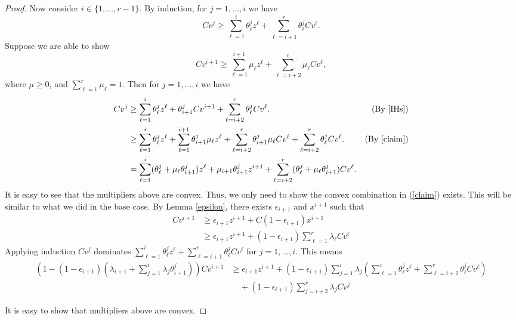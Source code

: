 \begin{proof}
	Now consider $i\in \{1,\ldots,r-1\}$. By induction, for $j=1,\ldots,i$ we have
	\begin{equation}\label{IHs}
	Cv^j \geq  \sum_{\ell=1}^{i} \theta^{j}_\ell z^\ell + \sum_{\ell=i+1}^{r}\theta^{j}_{\ell}Cv^\ell.
	\end{equation}
	Suppose we are able to show 
	 \begin{equation}\label{claim} 
	 Cv^{i+1} \geq \sum_{\ell=1}^{i+1} \mu_\ell z^\ell + \sum_{\ell=i+2}^{r}\mu_{\ell}Cv^\ell,\end{equation} 
	where $\mu\geq 0$, and $\sum_{\ell=1}^{r}\mu_{\ell}=1$. Then for $j=1,\ldots,i$ we have
	\begin{align*}
	Cv^j& \geq \sum_{\ell=1}^{i} \theta^{j}_\ell z^\ell +\theta^{j}_{i+1}Cv^{i+1}+  \sum_{\ell=i+2}^{r}\theta^{j}_{\ell}Cv^\ell.& (\mbox{By } \ref{IHs})\\
		& \geq \sum_{\ell=1}^{i} \theta^{j}_\ell z^\ell +\sum_{\ell=1}^{i+1}\theta^{j}_{i+1}\mu_\ell z^\ell+ \sum_{\ell=i+2}^{r}\theta^j_{i+1}\mu_{\ell}Cv^\ell +   \sum_{\ell=i+2}^{r}\theta^{j}_{\ell}Cv^\ell.& (\mbox{By } \ref{claim})\\
		&= \sum_{\ell=1}^{i} (\theta^j_\ell+\mu_{\ell}\theta^j_{i+1}) z^\ell + \mu_{i+1}\theta^j_{i+1}z^{i+1} + \sum_{\ell=i+2}^{r} (\theta^j_\ell+\mu_\ell\theta^j_{i+1})Cv^\ell.&
 			\end{align*} 
		It is easy to see that the multipliers above are convex. Thus, we only need to show the convex combination in (\ref{claim}) exists. This will be similar to what we did in the base case. By Lemma \ref{epsilon}, there exists $\epsilon_{i+1}$ and $x^{i+1}$ such that
		\begin{align*}
		Cv^{i+1}&\geq \epsilon_{i+1}z^{i+1}+ C(1-\epsilon_{i+1})x^{i+1}\\
		&\geq \epsilon_{i+1}z^{i+1}+ (1-\epsilon_{i+1})\sum_{\ell=1}^{r}\lambda_{\ell}Cv^\ell
			\end{align*}
			Applying induction $Cv^j$ dominates $ \sum_{\ell=1}^{i} \theta^{j}_\ell z^\ell + \sum_{\ell=i+1}^{r}\theta^{j}_{\ell}Cv^\ell$ for $j=1,\ldots,i$. 
			This means
			\begin{align*}
			(1-(1-\epsilon_{i+1})(\lambda_{i+1}+\sum_{j=1}^{i}\lambda_j\theta^j_{i+1}))Cv^{i+1}&\geq \epsilon_{i+1}z^{i+1}+(1-\epsilon_{i+1})\sum_{j=1}^{i}\lambda_j (\sum_{\ell=1}^{i}\theta^j_\ell z^\ell+ \sum_{\ell=i+2}^{r}\theta^j_\ell Cv^\ell)\\
			&\;\;\;\;+(1-\epsilon_{i+1})\sum_{j=i+2}^{r}\lambda_jCv^{j} 
			\end{align*}
			
		
			It is easy to show that  multipliers above are convex.
\end{proof}

